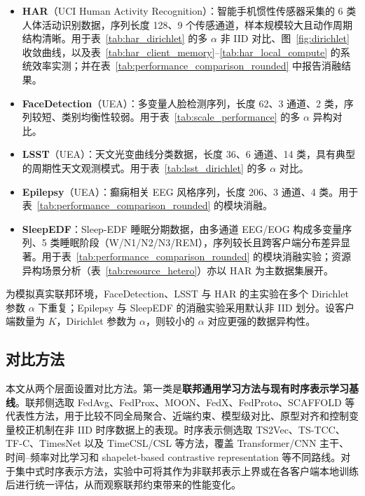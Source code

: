 \documentclass{article}
\begin{document}
\begin{itemize}[leftmargin=2em]
    \item \textbf{HAR}（UCI Human Activity Recognition）：智能手机惯性传感器采集的 6 类人体活动识别数据，序列长度 128、9 个传感通道，样本规模较大且动作周期结构清晰。用于表~\ref{tab:har_dirichlet} 的多 $\alpha$ 非 IID 对比、图~\ref{fig:dirichlet} 收敛曲线，以及表~\ref{tab:har_client_memory}--\ref{tab:har_local_compute} 的系统效率实测；并在表~\ref{tab:performance_comparison_rounded} 中报告消融结果。
    \item \textbf{FaceDetection}（UEA）：多变量人脸检测序列，长度 62、3 通道、2 类，序列较短、类别均衡性较弱。用于表~\ref{tab:scale_performance} 的多 $\alpha$ 异构对比。
    \item \textbf{LSST}（UEA）：天文光变曲线分类数据，长度 36、6 通道、14 类，具有典型的周期性天文观测模式。用于表~\ref{tab:lsst_dirichlet} 的多 $\alpha$ 对比。
    \item \textbf{Epilepsy}（UEA）：癫痫相关 EEG 风格序列，长度 206、3 通道、4 类。用于表~\ref{tab:performance_comparison_rounded} 的模块消融。
    \item \textbf{SleepEDF}：Sleep-EDF 睡眠分期数据，由多通道 EEG/EOG 构成多变量序列、5 类睡眠阶段（W/N1/N2/N3/REM），序列较长且跨客户端分布差异显著。用于表~\ref{tab:performance_comparison_rounded} 的模块消融实验；资源异构场景分析（表~\ref{tab:resource_hetero}）亦以 HAR 为主数据集展开。
\end{itemize}

为模拟真实联邦环境，FaceDetection、LSST 与 HAR 的主实验在多个 Dirichlet 参数 $\alpha$ 下重复；Epilepsy 与 SleepEDF 的消融实验采用默认非 IID 划分。设客户端数量为 $K$，Dirichlet 参数为 $\alpha$，则较小的 $\alpha$ 对应更强的数据异构性。

\subsection{对比方法}

本文从两个层面设置对比方法。第一类是\textbf{联邦通用学习方法与现有时序表示学习基线}。联邦侧选取 FedAvg\cite{fedavg}、FedProx\cite{fedprox}、MOON\cite{moon}、FedX\cite{fedx}、FedProto\cite{fedproto}、SCAFFOLD\cite{scaffold} 等代表性方法，用于比较不同全局聚合、近端约束、模型级对比、原型对齐和控制变量校正机制在非 IID 时序数据上的表现。时序表示侧选取 TS2Vec\cite{ts2vec}、TS-TCC\cite{tstcc}、TF-C\cite{tfc}、TimesNet\cite{timesnet} 以及 TimeCSL/CSL\cite{timescsl} 等方法，覆盖 Transformer/CNN 主干、时间--频率对比学习和 shapelet-based contrastive representation 等不同路线。对于集中式时序表示方法，实验中可将其作为非联邦表示上界或在各客户端本地训练后进行统一评估，从而观察联邦约束带来的性能变化。
\end{document}
